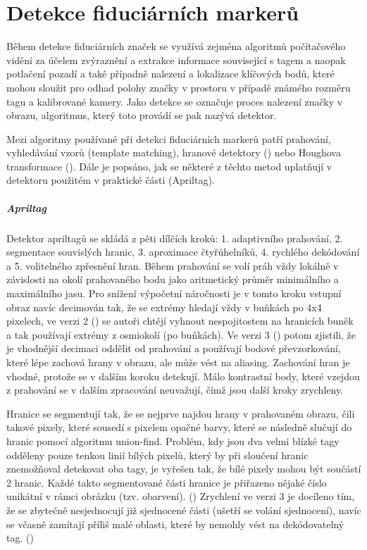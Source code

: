 \chapter{Detekce fiduciárních markerů} \label{chap:detection}
  Během detekce fiduciárních značek se využívá zejména algoritmů počítačového vidění za účelem zvýraznění a extrakce informace související s tagem a naopak potlačení pozadí a také případně nalezení a lokalizace klíčových bodů, které mohou sloužit pro odhad polohy značky v prostoru v případě známého rozměru tagu a kalibrované kamery. Jako detekce se označuje proces nalezení značky v obrazu, algoritmus, který toto provádí se pak nazývá detektor.

  Mezi algoritmy používané při detekci fiduciárních markerů patří prahování, vyhledávání vzorů (template matching), hranové detektory (\cite{apriltag2}) nebo Houghova transformace (\cite{Shabalina2019}). Dále je popsáno, jak se některé z těchto metod uplatňují v detektoru použitém v praktické části (Apriltag).

  \paragraph{Apriltag} Detektor apriltagů se skládá z pěti dílčích kroků: 1. adaptivního prahování, 2. segmentace souvislých hranic, 3. aproximace čtyřúhelníků, 4. rychlého dekódování a 5. volitelného zpřesnění hran. Během prahování se volí práh vždy lokálně v závislosti na okolí prahovaného bodu jako aritmetický průměr minimálního a maximálního jasu. Pro snížení výpočetní náročnosti je v tomto kroku vstupní obraz navíc decimován tak, že se extrémy hledají vždy v buňkách po 4x4 pixelech, ve verzi 2 (\cite{apriltag2}) se autoři chtějí vyhnout nespojitostem na hranicích buněk a tak používají extrémy z osmiokolí (po buňkách). Ve verzi 3 (\cite{apriltag3}) potom zjistili, že je vhodnější decimaci oddělit od prahování a používají bodové převzorkování, které lépe zachová hrany v obrazu, ale může vést na aliasing. Zachování hran je vhodné, protože se v dalším koroku detekují. Málo kontrastní body, které vzejdou z prahování se v dalším zpracování neuvažují, čímž jsou další kroky zrychleny. %

  Hranice se segmentují tak, že se nejprve najdou hrany v prahovaném obrazu, čili takové pixely, které sousedí s pixelem opačné barvy, které se následně slučují do hranic pomocí algoritmu union-find. Problém, kdy jsou dva velmi blízké tagy odděleny pouze tenkou linií bílých pixelů, který by při sloučení hranic znemožňoval detekovat oba tagy, je vyřešen tak, že bílé pixely mohou být součástí 2 hranic. Každé takto segmentované části hranice je přiřazeno nějaké číslo unikátní v rámci obrázku (tzv. obarvení). (\cite{apriltag2}) Zrychlení ve verzi 3 je docíleno tím, že se zbytečně nesjednocují již sjednocené části (ušetří se volání sjednocení), navíc se včasně zamítají příliš malé oblasti, které by nemohly vést na dekódovatelný tag. (\cite{apriltag3})

